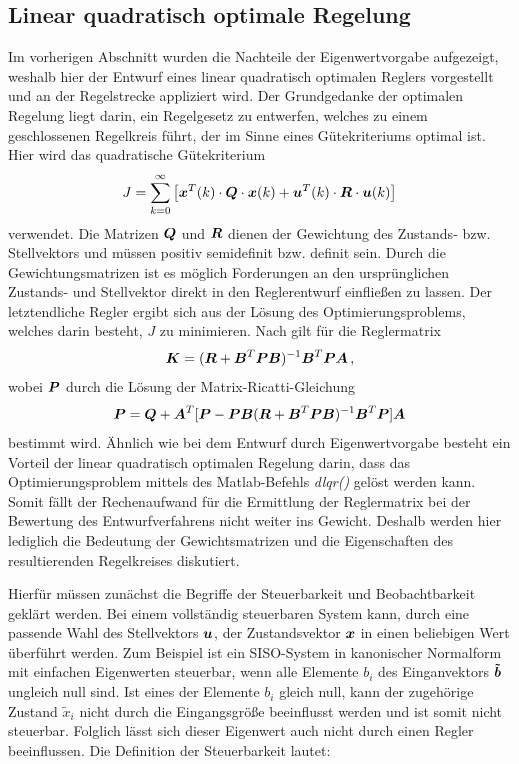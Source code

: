 \subsection{Linear quadratisch optimale Regelung}
Im vorherigen Abschnitt wurden die Nachteile der Eigenwertvorgabe aufgezeigt, weshalb hier der Entwurf eines linear quadratisch optimalen Reglers vorgestellt und an der Regelstrecke appliziert wird. Der Grundgedanke der optimalen Regelung liegt darin, ein Regelgesetz zu entwerfen, welches zu einem geschlossenen Regelkreis führt, der im Sinne eines Gütekriteriums optimal ist. Hier wird das quadratische Gütekriterium
\begin{equation}
J = \sum^{\infty}_{k=0} \left[\boldsymbol{x}^T(k)\cdot \boldsymbol{Q} \cdot \boldsymbol{x}(k) + \boldsymbol{u}^T(k)\cdot \boldsymbol{R}\cdot \boldsymbol{u}(k)\right]
\end{equation}
verwendet. Die Matrizen $\boldsymbol{Q}$ und $\boldsymbol{R}$ dienen der Gewichtung des Zustands- bzw. Stellvektors und müssen positiv semidefinit bzw. definit sein. Durch die Gewichtungsmatrizen ist es möglich Forderungen an den ursprünglichen Zustands- und Stellvektor direkt in den Reglerentwurf einfließen zu lassen. Der letztendliche Regler ergibt sich aus der Lösung des Optimierungsproblems, welches darin besteht, $J$ zu minimieren. Nach \cite[S. 177]{Ludyk} gilt für die Reglermatrix
\begin{equation}
\boldsymbol{K} = (\boldsymbol{R}+\boldsymbol{B}^T\boldsymbol{P}\boldsymbol{B})^{-1}\boldsymbol{B}^T\boldsymbol{P}\boldsymbol{A}\,,
\end{equation}
wobei $\boldsymbol{P}$ durch die Lösung der Matrix-Ricatti-Gleichung 
\begin{equation}
\boldsymbol{P} = \boldsymbol{Q}+\boldsymbol{A}^T[\boldsymbol{P}-\boldsymbol{P}\boldsymbol{B}(\boldsymbol{R}+\boldsymbol{B}^T\boldsymbol{P}\boldsymbol{B})^{-1}\boldsymbol{B}^T\boldsymbol{P}]\boldsymbol{A}
\end{equation}
bestimmt wird. Ähnlich wie bei dem Entwurf durch Eigenwertvorgabe besteht ein Vorteil der linear quadratisch optimalen Regelung darin, dass das Optimierungsproblem mittels des Matlab-Befehls \textit{dlqr()} gelöst werden kann. Somit fällt der Rechenaufwand für die Ermittlung der Reglermatrix bei der Bewertung des Entwurfverfahrens nicht weiter ins Gewicht. Deshalb werden hier lediglich die Bedeutung der Gewichtsmatrizen und die Eigenschaften des resultierenden Regelkreises diskutiert.

Hierfür müssen zunächst die Begriffe der Steuerbarkeit und Beobachtbarkeit geklärt werden. Bei einem vollständig steuerbaren System kann, durch eine passende Wahl des Stellvektors $\boldsymbol{u}$, der Zustandsvektor $\boldsymbol{x}$ in einen beliebigen Wert überführt werden. Zum Beispiel ist ein SISO-System in kanonischer Normalform mit einfachen Eigenwerten steuerbar, wenn alle Elemente $b_{i}$ des Einganvektors $\boldsymbol{\tilde{b}}$ ungleich null sind. Ist eines der Elemente $b_{i}$ gleich null, kann der zugehörige Zustand $\tilde{x}_i$ nicht durch die Eingangsgröße beeinflusst werden und ist somit nicht steuerbar. Folglich lässt sich dieser Eigenwert auch nicht durch einen Regler beeinflussen. Die Definition der Steuerbarkeit lautet:

